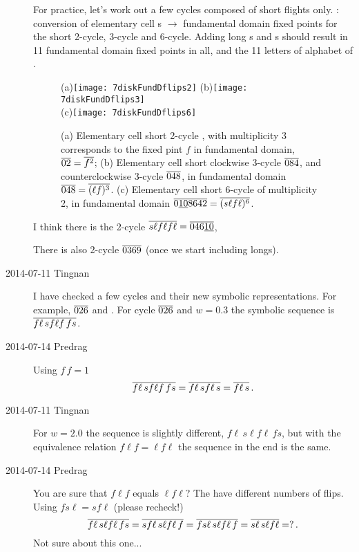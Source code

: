 \begin{description}
For practice, let's work out a
few  cycles composed of short flights only.
: conversion of elementary cell \po s $\to$
fundamental domain fixed points for the short 2-cycle, 3-cycle and
6-cycle.
Adding long \po s and \rpo s should result in 11 fundamental domain fixed
points in all, and the 11 letters of alphabet of .

\begin{figure}
\begin{center}
(a)\texttt{[image: 7diskFundDflips2]}
(b)\texttt{[image: 7diskFundDflips3]}
\\
(c)\texttt{[image: 7diskFundDflips6]}
\end{center}
\caption{
(a) Elementary cell short 2-cycle , with multiplicity 3 corresponds to
the fixed pint $f$ in fundamental domain, ${\overline{02}}={\overline{f^2}}$;
(b) Elementary cell short clockwise 3-cycle ${\overline{084}}$, and
counterclockwise 3-cycle ${\overline{048}}$, in
fundamental domain ${\overline{048}}={\overline{(\ell f)^3}}$.
(c) Elementary cell short 6-cycle of multiplicity 2, in
fundamental domain ${\overline{0\underline{10}8642}}={\overline{(s\ell f\ell )^6}}$.
    }
\label{7diskFundDflips2}
\end{figure}

I think there is the 2-cycle
${\overline{s\ell f\ell f\ell}} = {\overline{046\underline{10}}}$,

There is also 2-cycle ${\overline{0369}}$ (once we start including longs).

\item[2014-07-11 Tingnan]
I have checked a few cycles and their new symbolic representations. For
example, ${\overline{026}}$ and . For cycle ${\overline{026}}$ and
$w=0.3$ the symbolic sequence is ${\overline{f\ell\,sf\ell f\,fs}}$.
\item[2014-07-14 Predrag] Using $f\,f = 1$
\[
{\overline{f\ell\,sf\ell f\,fs}}
    = {\overline{f\ell\,sf\ell\,s}}
    = {\overline{f\ell\,s}}
\,.
\]

\item[2014-07-11 Tingnan]
For $w=2.0$ the
sequence is slightly different, $f\ell\,s\ell f \ell\,fs$, but with the
equivalence relation $f\ell f=\ell f \ell$ the sequence in the end is the
same.
\item[2014-07-14 Predrag]
You are sure that $f\ell f$ equals $\ell f \ell$?
The have different numbers of flips.
Using $fs\ell = s f\ell$ (please recheck!)
\[
{\overline{f\ell\,s\ell f \ell\,fs}}
    = {\overline{sf\ell\,s\ell f \ell\,f}}
    = {\overline{fs\ell\,s\ell f \ell\,f}}
    = {\overline{s\ell\,s\ell f \ell}}
    = ?
\,.
\]
Not sure about this one...


\end{description}
